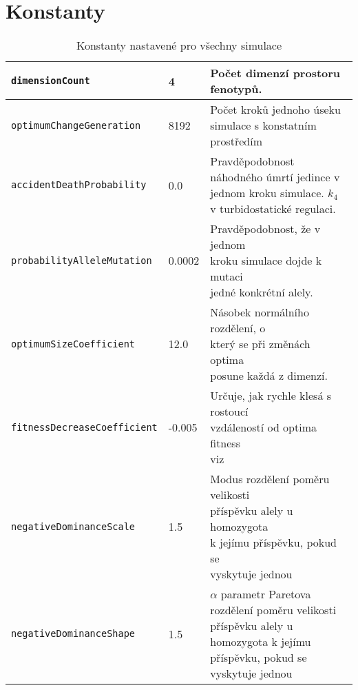 \section{Konstanty}
\label{sec:constants}



\begin{table}[h]
\centering
\label{constants}
\begin{tabularx}{\textwidth}{| l | l | l|}
\hline
\texttt{dimensionCount}             & 4      & Počet dimenzí prostoru fenotypů. \\
\hline
\texttt{optimumChangeGeneration}    & 8192   & \makecell[l]{Počet kroků jednoho úseku\\simulace s konstatním prostředím}\\
\hline
\texttt{accidentDeathProbability}   & 0.0    & \makecell[l]{Pravděpodobnost náhodného úmrtí\\jedince v jednom kroku simulace.\\$k_4$ v turbidostatické regulaci.} \\
\hline
\texttt{probabilityAlleleMutation}  & 0.0002 & \makecell[l]{Pravděpodobnost, že v jednom\\kroku simulace dojde k mutaci\\jedné konkrétní alely.}\\
\hline
\texttt{optimumSizeCoefficient}     & 12.0   & \makecell[l]{Násobek normálního rozdělení, o\\který se při změnách optima\\posune každá z dimenzí.}  \\
\hline
\texttt{fitnessDecreaseCoefficient} & -0.005 & \makecell[l]{Určuje, jak rychle klesá s rostoucí\\vzdáleností od optima fitness\\viz \citet{tenaillon2014utility}}\\
\hline
\texttt{negativeDominanceScale}     & 1.5    & \makecell[l]{Modus rozdělení poměru velikosti\\příspěvku alely u homozygota\\k jejímu příspěvku, pokud se\\vyskytuje jednou} \\
\hline
\texttt{negativeDominanceShape}     & 1.5    & \makecell[l]{$\alpha$ parametr Paretova rozdělení\\ poměru velikosti příspěvku alely\\ u homozygota k jejímu příspěvku,\\ pokud se vyskytuje jednou }\\
\hline
\end{tabularx}
\caption{Konstanty nastavené pro všechny simulace}
\end{table}
